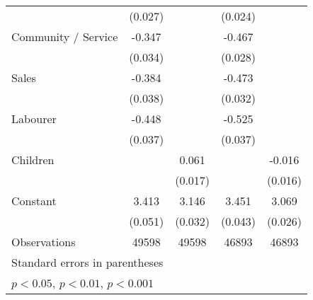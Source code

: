 {\begin{tabular}{l*{4}{c}}
                    &     (0.027)         &                     &     (0.024)         &                     \\
[1em]
Community / Service &      -0.347\sym{***}&                     &      -0.467\sym{***}&                     \\
                    &     (0.034)         &                     &     (0.028)         &                     \\
[1em]
Sales               &      -0.384\sym{***}&                     &      -0.473\sym{***}&                     \\
                    &     (0.038)         &                     &     (0.032)         &                     \\
[1em]
Labourer            &      -0.448\sym{***}&                     &      -0.525\sym{***}&                     \\
                    &     (0.037)         &                     &     (0.037)         &                     \\
[1em]
Children            &                     &       0.061\sym{***}&                     &      -0.016         \\
                    &                     &     (0.017)         &                     &     (0.016)         \\
[1em]
Constant            &       3.413\sym{***}&       3.146\sym{***}&       3.451\sym{***}&       3.069\sym{***}\\
                    &     (0.051)         &     (0.032)         &     (0.043)         &     (0.026)         \\
\hline
Observations        &       49598         &       49598         &       46893         &       46893         \\
\hline\hline
\multicolumn{5}{l}{\footnotesize Standard errors in parentheses}\\
\multicolumn{5}{l}{\footnotesize \sym{*} \(p<0.05\), \sym{**} \(p<0.01\), \sym{***} \(p<0.001\)}\\
\end{tabular}
}
